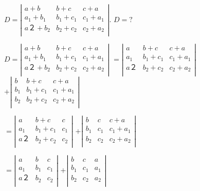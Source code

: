 \documentclass[printbox]{BHCexam}
\begin{document}
\begin{questions}
\question \text{\bf{[例2]}}
$D=\left|
\begin{array}{ccc}
  a+b & b+c & c+a \\  %
  a_1+b_1& b_1+c_1 & c_1+a_1\\  %
  a２+b_2 & b_2+c_2  & c_2+a_2\\  %
\end{array}\right|$.
$D=?$

\begin{solution}
  $D=\left|
\begin{array}{ccc}
  a+b & b+c & c+a \\  %
  a_1+b_1& b_1+c_1 & c_1+a_1\\  %
  a２+b_2 & b_2+c_2  & c_2+a_2\\  %
\end{array}\right|$
$=\left|
\begin{array}{ccc}
  a & b+c & c+a \\  %
  a_1& b_1+c_1 & c_1+a_1\\  %
  a２ & b_2+c_2  & c_2+a_2\\  %
\end{array}\right|$
$+\left|
\begin{array}{ccc}
  b & b+c & c+a \\  %
  b_1& b_1+c_1 & c_1+a_1\\  %
  b_2 & b_2+c_2  & c_2+a_2\\  %
\end{array}\right|$

$=\left|
\begin{array}{ccc}
  a & b+c & c \\  %
  a_1& b_1+c_1 & c_1\\  %
  a２ & b_2+c_2  & c_2\\  %
\end{array}\right|$
$+\left|
\begin{array}{ccc}
  b & c & c+a \\  %
  b_1& c_1 & c_1+a_1\\  %
  b_2 & c_2  & c_2+a_2\\  %
\end{array}\right|$

$=\left|
\begin{array}{ccc}
  a & b & c \\  %
  a_1& b_1 & c_1\\  %
  a２ & b_2  & c_2\\  %
\end{array}\right|$
$+\left|
\begin{array}{ccc}
  b & c & a \\  %
  b_1& c_1 & a_1\\  %
  b_2 & c_2  & a_2\\  %
\end{array}\right|$


\end{solution}
\end{questions}
\end{document}
